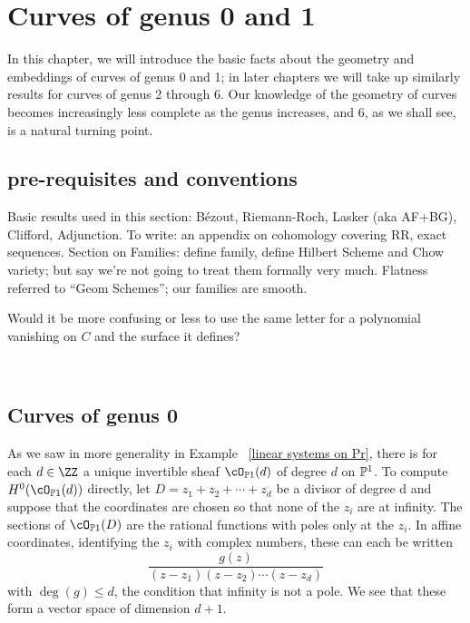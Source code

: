 

\chapter{Curves of genus 0 and 1}\label{genus 0 and 1 chapter}

 In this chapter, we will introduce  the basic facts about the geometry and embeddings of curves of genus 0 and 1; in later chapters we will take up
 similarly results for curves of genus 2 through 6. Our knowledge of the geometry of curves becomes increasingly less complete as the genus increases, and 6, as we shall see, is a natural turning point. 

\section{pre-requisites and conventions}


Basic results used in this section: B\'ezout, Riemann-Roch, Lasker (aka AF+BG), Clifford, Adjunction.
To write: an appendix on cohomology covering RR, exact sequences.
Section on Families: define family, define Hilbert Scheme and Chow variety;  but say we're not going to treat them formally very much. Flatness referred to ``Geom Schemes''; our families are smooth.



Would it be more confusing or less to use the same letter for a polynomial vanishing on $C$ and the surface it defines?

\

\section{Curves of genus 0} 



As we saw in more generality in Example ~\ref{linear systems on Pr}, there is for each $d \in \ZZ$  a unique invertible sheaf $\cO_{\PP1} (d)$
of degree $d$ on $\PP^1$. To compute $H^0(\cO_{\PP1} (d))$ directly, let $D = z_1 +z_2 +\cdots+z_d$ be a divisor of degree d and suppose that the coordinates are chosen so that none of the $z_i$ are at infinity. The sections of $\cO_{\PP1} (D)$ are the rational functions with poles only at 
the $z_i$. In affine coordinates, identifying the $z_i$ with complex numbers, these can each be written
$$
\frac{g(z)}{(z-z_1)(z-z_2)\cdots(z-z_d)}
$$
with $\deg(g) \leq d$, the condition that infinity is not a pole. We see that these form a vector space of dimension $d+1$.

